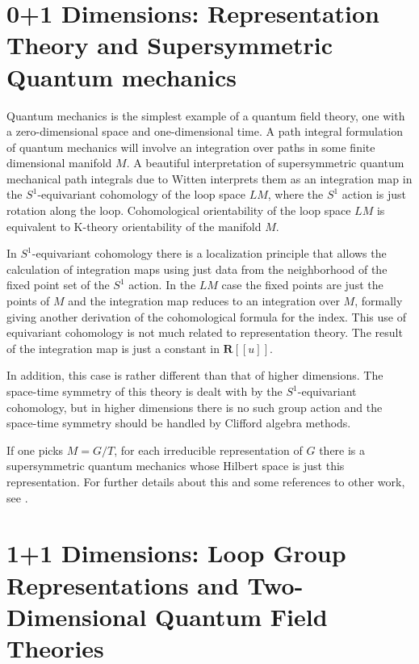 \documentclass[a4paper,a4paper]{article}
\theoremstyle{conjecture}
\begin{document}
\section{0+1 Dimensions: Representation Theory and Supersymmetric Quantum mechanics}

Quantum mechanics is the simplest example of a quantum field theory, one with
a zero-dimensional space and one-dimensional time.  A path integral formulation
of quantum mechanics will involve an integration over paths in some finite dimensional
manifold $M$.  A beautiful interpretation of supersymmetric quantum mechanical path integrals due
to Witten \cite{Atiyah3} interprets them as an integration map in the $S^1$-equivariant cohomology
of the loop space $LM$, where the $S^1$ action is just rotation along the loop.  Cohomological
orientability of the loop space $LM$ is equivalent to K-theory orientability of the manifold $M$.

In $S^1$-equivariant cohomology there is a localization principle that allows the calculation
of integration maps using just data from the neighborhood of the fixed point set of the $S^1$ action.
In the $LM$ case the fixed points are just the points of $M$ and the integration map reduces to
an integration over $M$, formally giving another derivation of the cohomological formula for the index.
This use of equivariant cohomology is not much related to representation theory.  The result of 
the integration map is just a constant in ${\mathbf R} [[u]]$. 

In addition, this case is rather different than that of higher dimensions.  The space-time
symmetry of this theory is dealt with by the $S^1$-equivariant cohomology, but in higher dimensions
there is no such group action and the space-time symmetry should be handled by Clifford algebra methods.

If one picks $M=G/T$, for each irreducible representation of $G$ there is a supersymmetric quantum
mechanics whose Hilbert space is just this representation. For further details about this and some
references to other work, see \cite{Woit2}.

\section{1+1 Dimensions: Loop Group Representations and Two-Dimensional Quantum Field Theories}
\end{document}
